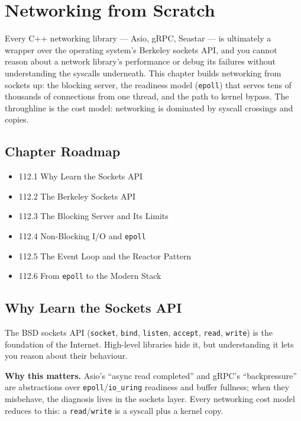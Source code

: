 \chapter{Networking from Scratch}

Every C++ networking library --- Asio, gRPC, Seastar --- is ultimately a wrapper over the operating system's Berkeley sockets API, and you cannot reason about a network library's performance or debug its failures without understanding the syscalls underneath. This chapter builds networking from sockets up: the blocking server, the readiness model (\texttt{epoll}) that serves tens of thousands of connections from one thread, and the path to kernel bypass. The throughline is the cost model: networking is dominated by syscall crossings and copies.

\section*{Chapter Roadmap}
\begin{itemize}
\item 112.1 Why Learn the Sockets API
\item 112.2 The Berkeley Sockets API
\item 112.3 The Blocking Server and Its Limits
\item 112.4 Non-Blocking I/O and \texttt{epoll}
\item 112.5 The Event Loop and the Reactor Pattern
\item 112.6 From \texttt{epoll} to the Modern Stack
\end{itemize}

\section{Why Learn the Sockets API}
The BSD sockets API (\texttt{socket}, \texttt{bind}, \texttt{listen}, \texttt{accept}, \texttt{read}, \texttt{write}) is the foundation of the Internet. High-level libraries hide it, but understanding it lets you reason about their behaviour.

\textbf{Why this matters.} Asio's ``async read completed'' and gRPC's ``backpressure'' are abstractions over \texttt{epoll}/\texttt{io\_uring} readiness and buffer fullness; when they misbehave, the diagnosis lives in the sockets layer. Every networking cost model reduces to this: a \texttt{read}/\texttt{write} is a syscall plus a kernel copy.

